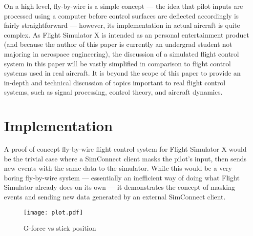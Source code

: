 \documentclass[10pt]{article}
\begin{document}
\begin{multicols}{2}
On a high level, fly-by-wire is a simple concept --- the idea that pilot inputs are processed using a computer before control surfaces are deflected accordingly is fairly straightforward ---  however, its implementation in actual aircraft is quite complex.  As Flight Simulator X is intended as an personal entertainment product (and because the author of this paper is currently an undergrad student not majoring in aerospace engineering), the discussion of a simulated flight control system in this paper will be vastly simplified in comparison to flight control systems used in real aircraft.  It is beyond the scope of this paper to provide an in-depth and technical discussion of topics important to real flight control systems, such as signal processing, control theory, and aircraft dynamics.

\section{Implementation}

A proof of concept fly-by-wire flight control system for Flight Simulator X would be the trivial case where a SimConnect client masks the pilot's input, then sends new events with the same data to the simulator.  While this would be a very boring fly-by-wire system --- essentially an inefficient way of doing what Flight Simulator already does on its own --- it demonstrates the concept of masking events and sending new data generated by an external SimConnect client.



\begin{figure}[H]
\centering
\texttt{[image: plot.pdf]}
\caption{G-force vs stick position}
\end{figure}

%

\end{multicols}
\end{document}
